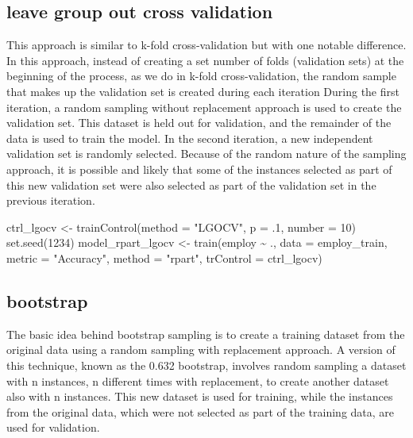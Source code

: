 \documentclass[
]{book}
\newenvironment{Shaded}{\begin{snugshade}}{\end{snugshade}}
\newcommand{\AttributeTok}[1]{\textcolor[rgb]{0.77,0.63,0.00}{#1}}
\newcommand{\DecValTok}[1]{\textcolor[rgb]{0.00,0.00,0.81}{#1}}
\newcommand{\FunctionTok}[1]{\textcolor[rgb]{0.00,0.00,0.00}{#1}}
\newcommand{\NormalTok}[1]{#1}
\newcommand{\OtherTok}[1]{\textcolor[rgb]{0.56,0.35,0.01}{#1}}
\newcommand{\SpecialCharTok}[1]{\textcolor[rgb]{0.00,0.00,0.00}{#1}}
\newcommand{\StringTok}[1]{\textcolor[rgb]{0.31,0.60,0.02}{#1}}
\begin{document}
\hypertarget{leave-group-out-cross-validation}{%
\subsection{leave group out cross validation}\label{leave-group-out-cross-validation}}

This approach is similar to k-fold cross-validation but with one notable
difference. In this approach, instead of creating a set number of folds (validation sets) at the beginning of the process, as we do in k-fold cross-validation, the random sample that makes up the validation set is created during each iteration
During the first iteration, a random sampling without replacement approach is used
to create the validation set. This dataset is held out for validation, and the remainder of the data is used to train the model. In the second iteration, a new independent validation set is randomly selected. Because of the random nature of the sampling approach, it is possible and likely that some of the instances selected as part of this new validation set were also selected as part of the validation set in the previous iteration.

\begin{Shaded}
\begin{Highlighting}[]
\NormalTok{ctrl\_lgocv }\OtherTok{\textless{}{-}} \FunctionTok{trainControl}\NormalTok{(}\AttributeTok{method =} \StringTok{"LGOCV"}\NormalTok{, }\AttributeTok{p =}\NormalTok{ .}\DecValTok{1}\NormalTok{, }\AttributeTok{number =} \DecValTok{10}\NormalTok{)}
\FunctionTok{set.seed}\NormalTok{(}\DecValTok{1234}\NormalTok{)}
\NormalTok{model\_rpart\_lgocv }\OtherTok{\textless{}{-}} \FunctionTok{train}\NormalTok{(employ }\SpecialCharTok{\textasciitilde{}}\NormalTok{ .,}
                           \AttributeTok{data =}\NormalTok{ employ\_train,}
                           \AttributeTok{metric =} \StringTok{"Accuracy"}\NormalTok{,}
                           \AttributeTok{method =} \StringTok{"rpart"}\NormalTok{,}
                           \AttributeTok{trControl =}\NormalTok{ ctrl\_lgocv)}
\end{Highlighting}
\end{Shaded}

\hypertarget{bootstrap}{%
\subsection{bootstrap}\label{bootstrap}}

The basic idea behind bootstrap sampling is to create a training dataset from
the original data using a random sampling with replacement approach. A version of this technique, known as the 0.632 bootstrap, involves random sampling a dataset with n instances, n different times with replacement, to create another dataset also with n instances. This new dataset is used for training, while the instances from the original data, which were not selected as part of the training data, are used for validation.
\end{document}
